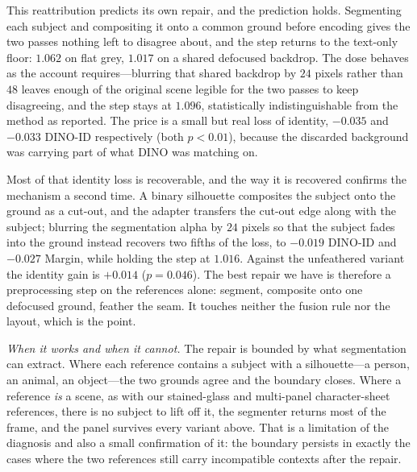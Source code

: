 \documentclass[10pt,twocolumn,letterpaper]{article}
\begin{document}
This reattribution predicts its own repair, and the prediction holds.
Segmenting each subject and compositing it onto a common ground before
encoding gives the two passes nothing left to disagree about, and the step
returns to the text-only floor: $1.062$ on flat grey, $1.017$ on a shared
defocused backdrop.  The dose behaves as the account requires---blurring that
shared backdrop by $24$ pixels rather than $48$ leaves enough of the original
scene legible for the two passes to keep disagreeing, and the step stays at
$1.096$, statistically indistinguishable from the method as reported.  The
price is a small but real loss of identity, $-0.035$ and $-0.033$ DINO-ID
respectively (both $p{<}0.01$), because the discarded background was carrying
part of what DINO was matching on.

Most of that identity loss is recoverable, and the way it is recovered
confirms the mechanism a second time.  A binary silhouette composites the
subject onto the ground as a cut-out, and the adapter transfers the cut-out
edge along with the subject; blurring the segmentation alpha by $24$ pixels so
that the subject fades into the ground instead recovers two fifths of the
loss, to $-0.019$ DINO-ID and $-0.027$ Margin, while holding the step at
$1.016$.  Against the unfeathered variant the identity gain is $+0.014$
($p{=}0.046$).  The best repair we have is therefore a preprocessing step on
the references alone: segment, composite onto one defocused ground, feather
the seam.  It touches neither the fusion rule nor the layout, which is the
point.

\noindent\textit{When it works and when it cannot.}
The repair is bounded by what segmentation can extract.  Where each reference
contains a subject with a silhouette---a person, an animal, an object---the
two grounds agree and the boundary closes.  Where a reference \emph{is} a
scene, as with our stained-glass and multi-panel character-sheet references,
there is no subject to lift off it, the segmenter returns most of the frame,
and the panel survives every variant above.  That is a limitation of the
diagnosis and also a small confirmation of it: the boundary persists in
exactly the cases where the two references still carry incompatible contexts
after the repair.
\end{document}
